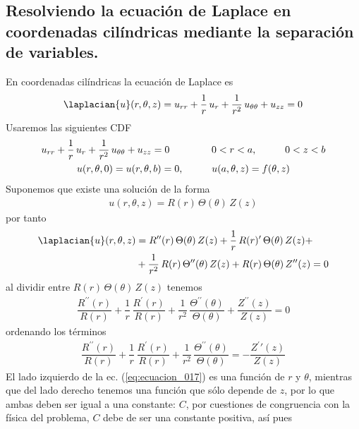 \subsection{Resolviendo la ecuación de Laplace en coordenadas cilíndricas mediante la separación de variables.}
En coordenadas cilíndricas la ecuación de Laplace es
\begin{align*}
\laplacian{u} (r, \theta, z) = u_{rr} + \dfrac{1}{r} \, u_{r} + \dfrac{1}{r^{2}} \, u_{\theta \theta} + u_{z z} = 0
\end{align*}
Usaremos las siguientes CDF
\begin{align*}
\begin{gathered}
u_{rr} + \dfrac{1}{r} \, u_{r} + \dfrac{1}{r^{2}} \, u_{\theta \theta} + u_{z z} = 0 \hspace{1.5cm} 0 < r < a, \hspace{1cm} 0 < z < b \\
u(r, \theta, 0) = u(r, \theta, b) = 0, \hspace{1cm} u(a, \theta, z) = f(\theta, z)
\end{gathered}
\end{align*}
Suponemos que existe una solución de la forma
\begin{align*}
u(r, \theta, z) = R(r) \, \Theta (\theta) \, Z(z) 
\end{align*}
por tanto
\begin{align*}
\laplacian{u} (r,\theta, z) &= R^{\prime \prime} (r) \, \Theta (\theta) \, Z (z) + \dfrac{1}{r} \, R (r)^{\prime} \, \Theta (\theta) \, Z (z) + \\
&+ \dfrac{1}{r^{2}} \, R (r) \, \Theta^{\prime \prime} (\theta) \, Z (z) + R(r) \, \Theta (\theta) \, Z^{\prime \prime} (z) = 0
\end{align*}
al dividir entre $R(r) \, \Theta (\theta) \, Z(z)$ tenemos
\begin{align*}
\dfrac{R^{\prime \prime}(r)}{R(r)} + \dfrac{1}{r} \, \dfrac{R^{\prime} (r)}{R (r)} + \dfrac{1}{r^{2}} \, \dfrac{\Theta^{\prime \prime} (\theta)}{\Theta (\theta)} + \dfrac{Z^{\prime \prime}(z)}{Z(z)} = 0
\end{align*}
ordenando los términos
\begin{align}
\dfrac{R^{\prime \prime}(r)}{R(r)} + \dfrac{1}{r} \, \dfrac{R^{\prime} (r)}{R (r)} + \dfrac{1}{r^{2}} \, \dfrac{\Theta^{\prime \prime} (\theta)}{\Theta (\theta)} = - \dfrac{Z^{\prime}{\prime}(z)}{Z(z)}
\label{eq:ecuacion_017}
\end{align}
El lado izquierdo de la ec. (\ref{eq:ecuacion_017}) es una función de $r$ y $\theta$, mientras que del lado derecho tenemos una función que sólo depende de $z$, por lo que ambas deben ser igual a una constante: $C$, por cuestiones de congruencia con la física del problema, $C$ debe de ser una constante positiva, así pues
